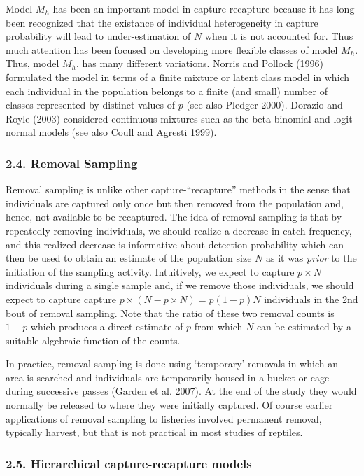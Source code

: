 \documentclass{book}
\begin{document}
Model $M_h$ has been an important model in capture-recapture because
it has long been recognized that the existance of individual
heterogeneity in capture probability will lead to under-estimation of
$N$ when it is not accounted for.  Thus much attention has been
focused on developing more flexible classes of model $M_h$.  Thus,
model $M_h$, has many different variations. Norris and Pollock (1996)
formulated the model in terms of a finite mixture or latent class
model in which each individual in the population belongs to a finite
(and small) number of classes represented by distinct values of $p$
(see also Pledger 2000). Dorazio and Royle (2003) considered
continuous mixtures such as the beta-binomial and logit-normal models
(see also Coull and Agresti 1999).

\subsubsection*{2.4. Removal Sampling}

Removal sampling is unlike other capture-``recapture'' methods in the
sense that individuals are captured only once but then removed from
the population and, hence, not available to be recaptured. The idea of
removal sampling is that by repeatedly removing individuals, we should
realize a decrease in catch frequency, and this realized decrease is
informative about detection probability which can then be used to
obtain an estimate of the population size $N$ as it was {\it prior} to
the initiation of the sampling activity. Intuitively, we expect to
capture $p \times N$ individuals during a single sample and, if we
remove those individuals, we should expect to capture capture $p
\times (N - p \times N) = p(1-p) N$ individuals in the 2nd bout of
removal sampling. Note that the ratio of these two removal counts is
$1-p$ which produces a direct estimate of $p$ from which $N$ can be
estimated by a suitable algebraic function of the counts.

In practice, removal sampling is done using `temporary' removals in
which an area is searched and individuals are temporarily housed in a
bucket or cage during successive passes (Garden et al. 2007). At the
end of the study they would normally be released to where they were
initially captured. Of course earlier applications of removal sampling
to fisheries involved permanent removal, typically harvest, but that
is not practical in most studies of reptiles.

\subsubsection*{2.5. Hierarchical capture-recapture models}
\end{document}

